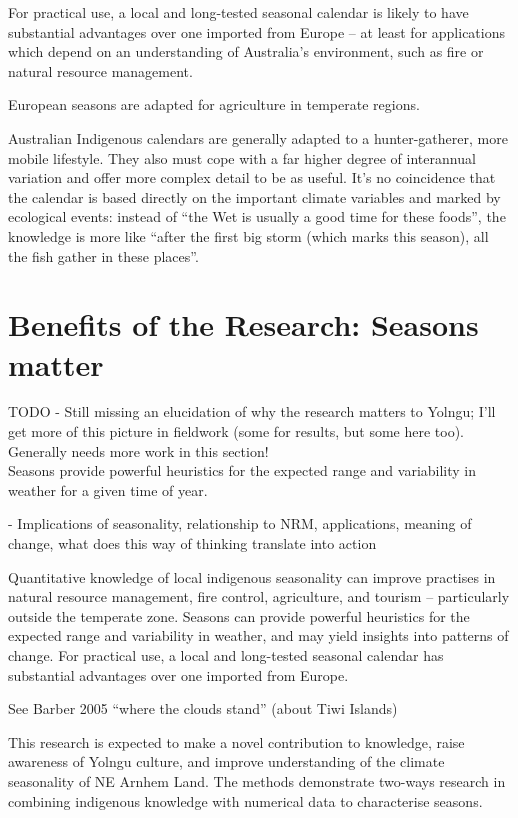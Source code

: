 For practical use, a local and long-tested seasonal calendar is likely to have 
substantial advantages over one imported from Europe – at least for 
applications which depend on an understanding of Australia's environment, such 
as fire or natural resource management.

European seasons are adapted for agriculture in temperate regions.

Australian Indigenous calendars are generally adapted to a hunter-gatherer, 
more mobile lifestyle.  They also must cope with a far higher degree of 
interannual variation and offer more complex detail to be as useful.  It's no 
coincidence that the calendar is based directly on the important climate 
variables and marked by ecological events:  instead of ``the Wet is usually a 
good time for these foods'', the knowledge is more like ``after the first big 
storm (which marks this season), all the fish gather in these places''.



\section{Benefits of the Research: Seasons matter}
TODO - Still missing an elucidation of why the research matters to Yolngu; I'll 
get more of this picture in fieldwork (some for results, but some here too).
Generally needs more work in this section!\\

Seasons provide powerful heuristics for the expected range and variability in 
weather for a given time of year.

-	Implications of seasonality, relationship to NRM, applications, meaning of 
change, what does this way of thinking translate into action


Quantitative knowledge of local indigenous seasonality can improve practises in 
natural resource management, fire control, agriculture, and tourism – 
particularly outside the temperate zone.  Seasons can provide powerful 
heuristics for the expected range and variability in weather, and may yield 
insights into patterns of change.  For practical use, a local and long-tested 
seasonal calendar has substantial advantages over one imported from Europe.


See Barber 2005 ``where the clouds stand'' (about Tiwi Islands)

This research is expected to make a novel contribution to knowledge, raise 
awareness of Yolngu culture, and improve understanding of the climate 
seasonality of NE Arnhem Land.  The methods demonstrate two-ways research in 
combining indigenous knowledge with numerical data to characterise seasons.

